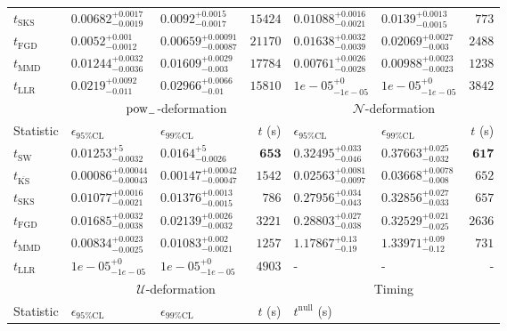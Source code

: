 \begin{tabular}{l|llr|llr}
	$t_{\mathrm{SKS}}$ & $0.00682_{-0.0019}^{+0.0017}$ & $0.0092_{-0.0017}^{+0.0015}$ & $15424$ & $0.01088_{-0.0021}^{+0.0016}$ & $0.0139_{-0.0015}^{+0.0013}$ & $773$ \\
	$t_{\mathrm{FGD}}$ & ${\mathbf{0.0052_{-0.0012}^{+0.001}}}$ & ${\mathbf{0.00659_{-0.00087}^{+0.00091}}}$ & $21170$ & $0.01638_{-0.0039}^{+0.0032}$ & $0.02069_{-0.003}^{+0.0027}$ & $2488$ \\
	$t_{\mathrm{MMD}}$ & $0.01244_{-0.0036}^{+0.0032}$ & $0.01609_{-0.003}^{+0.0029}$ & $17784$ & $0.00761_{-0.0028}^{+0.0026}$ & $0.00988_{-0.0023}^{+0.0023}$ & $1238$ \\
	$t_{\mathrm{LLR}}$ & $0.0219_{-0.011}^{+0.0092}$ & $0.02966_{-0.01}^{+0.0066}$ & $15810$ & $1e-05_{-1e-05}^{+0}$ & $1e-05_{-1e-05}^{+0}$ & $3842$ \\
	\toprule
	\multicolumn{1}{c}{} & \multicolumn{3}{c}{$\rm{pow}_{-}$-deformation} & \multicolumn{3}{c}{$\mathcal{N}$-deformation} \\
	Statistic & $\epsilon_{95\%\mathrm{CL}}$ & $\epsilon_{99\%\mathrm{CL}}$ & $t$ (s) & $\epsilon_{95\%\mathrm{CL}}$ & $\epsilon_{99\%\mathrm{CL}}$ & $t$ (s) \\
	\midrule
	$t_{\mathrm{SW}}$ & $0.01253_{-0.0032}^{+5}$ & $0.0164_{-0.0026}^{+5}$ & ${\mathbf{653}}$ & $0.32495_{-0.046}^{+0.033}$ & $0.37663_{-0.032}^{+0.025}$ & ${\mathbf{617}}$ \\
	$t_{\overline{\mathrm{KS}}}$ & ${\mathbf{0.00086_{-0.00043}^{+0.00044}}}$ & ${\mathbf{0.00147_{-0.00047}^{+0.00042}}}$ & $1542$ & ${\mathbf{0.02563_{-0.0097}^{+0.0081}}}$ & ${\mathbf{0.03668_{-0.008}^{+0.0078}}}$ & $652$ \\
	$t_{\mathrm{SKS}}$ & $0.01077_{-0.0021}^{+0.0016}$ & $0.01376_{-0.0015}^{+0.0013}$ & $786$ & $0.27956_{-0.043}^{+0.034}$ & $0.32856_{-0.033}^{+0.027}$ & $657$ \\
	$t_{\mathrm{FGD}}$ & $0.01685_{-0.0038}^{+0.0032}$ & $0.02139_{-0.0032}^{+0.0026}$ & $3221$ & $0.28803_{-0.038}^{+0.027}$ & $0.32529_{-0.025}^{+0.021}$ & $2636$ \\
	$t_{\mathrm{MMD}}$ & $0.00834_{-0.0025}^{+0.0023}$ & $0.01083_{-0.0021}^{+0.002}$ & $1257$ & $1.17867_{-0.19}^{+0.13}$ & $1.33971_{-0.12}^{+0.09}$ & $731$ \\
	$t_{\mathrm{LLR}}$ & $1e-05_{-1e-05}^{+0}$ & $1e-05_{-1e-05}^{+0}$ & $4903$ & - & - & - \\
	\toprule
	\multicolumn{1}{c}{} & \multicolumn{3}{c}{$\mathcal{U}$-deformation} & \multicolumn{3}{c}{Timing} \\
	Statistic & $\epsilon_{95\%\mathrm{CL}}$ & $\epsilon_{99\%\mathrm{CL}}$ & $t$ (s) & $t^{\mathrm{null}}$ (s) \\

\end{tabular}
